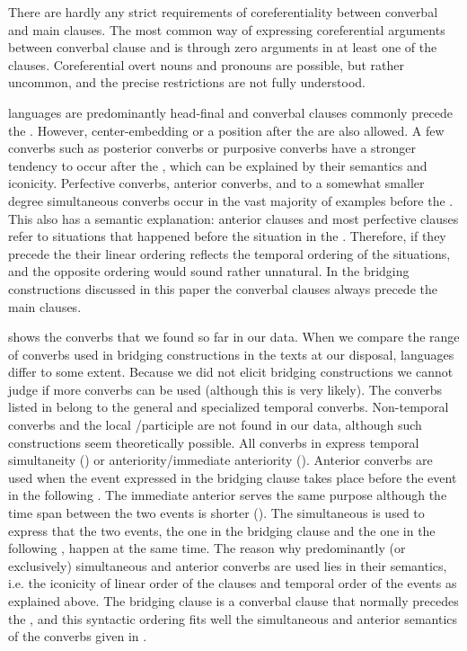 \documentclass[output=paper]{LSP/langsci}
\begin{document}
There are hardly any strict requirements of coreferentiality between converbal and main clauses. The most common way of expressing coreferential arguments between converbal clause and  is through zero arguments in at least one of the clauses. Coreferential overt nouns and pronouns are possible, but rather uncommon, and the precise restrictions are not fully understood.

 languages are predominantly head-final and converbal clauses commonly precede the . However, center-embedding or a position after the  are also allowed. A few converbs such as posterior converbs or purposive converbs have a stronger tendency to occur after the , which can be explained by their semantics and iconicity. Perfective converbs, anterior converbs, and to a somewhat smaller degree simultaneous converbs occur in the vast majority of examples before the . This also has a semantic explanation: anterior  clauses and most perfective  clauses refer to situations that happened before the situation in the . Therefore, if they precede the  their linear ordering reflects the temporal ordering of the situations, and the opposite ordering would sound rather unnatural. In the bridging constructions discussed in this paper the converbal clauses always precede the main clauses.

 shows the converbs that we found so far in our data. When we compare the range of converbs used in bridging constructions in the texts at our disposal,  languages differ to some extent. Because we did not elicit bridging constructions we cannot judge if more converbs can be used (although this is very likely). The converbs listed in  belong to the general and specialized temporal converbs. Non-temporal converbs and the local /participle are not found in our data, although such constructions seem theoretically possible. All converbs in  express temporal simultaneity () or anteriority/immediate anteriority (). Anterior converbs are used when the event expressed in the bridging clause takes place before the event in the following . The immediate anterior  serves the same purpose although the time span between the two events is shorter (). The simultaneous  is used to express that the two events, the one in the bridging clause and the one in the following , happen at the same time. The reason why predominantly (or exclusively) simultaneous and anterior converbs are used lies in their semantics, i.e. the iconicity of linear order of the clauses and temporal order of the events as explained above. The bridging clause is a converbal clause that normally precedes the , and this syntactic ordering fits well the simultaneous and anterior semantics of the converbs given in .    
\end{document}
